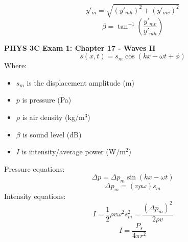 \documentclass[11pt]{article}
\begin{document}
    \begin{equation}
        y'_{m} = \sqrt{(y'_{mh})^2 + (y'_{mv})^2} \tag{net amplitude}
    \end{equation}
    \begin{equation}
        \beta = \tan^{-1}({\frac{y'_{mv}}{y'_{mh}}}) \tag{net phase constant}
    \end{equation}

    \newpage
    \noindent \textbf{PHYS 3C Exam 1: Chapter 17 - Waves II}
    \begin{equation}
        s(x,t) = s_m\cos(kx - \omega t + \phi) \tag{sound equation}
    \end{equation}
    \noindent Where:
    \begin{itemize}
        \item $s_m$ is the displacement amplitude (m)
        \item $p$ is pressure (Pa)
        \item $\rho$ is air density (kg/m$^3$)
        \item $\beta$ is sound level (dB)
        \item $I$ is intensity/average power (W/m$^2$)
    \end{itemize}
    \noindent Pressure equations:
    \begin{equation}
        \Delta p = \Delta p_m \sin(kx - \omega t) \tag{pressure change}
    \end{equation}
    \begin{equation}
        \Delta p_m = (v \rho \omega)s_m \tag{pressure amplitude}
    \end{equation}
    \noindent Intensity equations:
    \begin{equation}
        I = \frac{1}{2} \rho v \omega^2 s_{m}^2 = \frac{(\Delta p_m)^2}{2 \rho v} \tag{intensity}\label{eq:intensity}
    \end{equation}
    \begin{equation}
        I = \frac{P_s}{4 \pi r^2} \tag{intensity at distance r}
    \end{equation}
\end{document}
